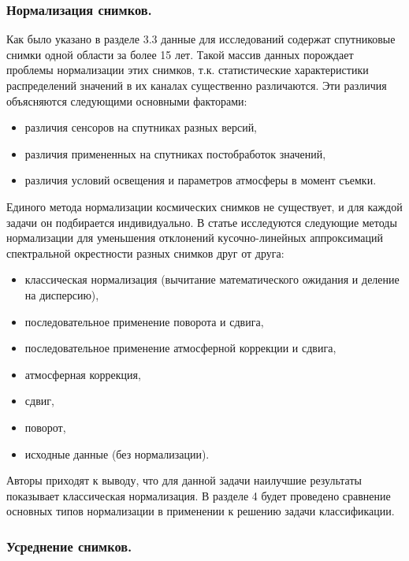 \documentclass[14pt]{extarticle}
\begin{document}
\subsubsection{Нормализация снимков.}

\par
Как было указано в разделе 3.3 данные для исследований содержат спутниковые снимки
одной области за более 15 лет. Такой массив данных порождает проблемы нормализации этих снимков,
т.к. статистические характеристики распределений значений в их каналах существенно различаются.
Эти различия объясняются следующими основными факторами:
\begin{itemize}
    \item различия сенсоров на спутниках разных версий,
    \item различия примененных на спутниках постобработок значений,
    \item различия условий освещения и параметров атмосферы в момент съемки.
\end{itemize}
\par
Единого метода нормализации космических снимков не существует, и для каждой задачи он
подбирается индивидуально. В статье \cite{rukhovich-2} исследуются следующие методы нормализации
для уменьшения отклонений кусочно-линейных аппроксимаций спектральной окрестности 
разных снимков друг от друга:
\begin{itemize}
    \item классическая нормализация (вычитание математического ожидания и деление на дисперсию),
    \item последовательное применение поворота и сдвига,
    \item последовательное применение атмосферной коррекции и сдвига,
    \item атмосферная коррекция,
    \item сдвиг,
    \item поворот,
\item исходные данные (без нормализации).
\end{itemize}
Авторы приходят к выводу, что для данной задачи наилучшие результаты 
показывает классическая нормализация. В разделе 4 будет проведено сравнение основных
типов нормализации в применении к решению задачи классификации.

\subsubsection{Усреднение снимков.}
\end{document}
